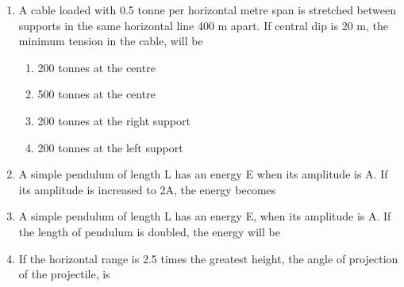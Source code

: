 \documentclass[11pt,a4paper]{article}
\begin{document}
\begin{enumerate}
{}
\\
\item{A cable loaded with 0.5 tonne per horizontal metre span is stretched between supports in the same horizontal line 400 m apart. If central dip is 20 m, the minimum tension in the cable, will be}
\begin{enumerate}[label=\Alph*.]
\item{200 tonnes at the centre}
\item{500 tonnes at the centre}
\item{200 tonnes at the right support}
\item{200 tonnes at the left support}
\end{enumerate}
\item{A simple pendulum of length L has an energy E when its amplitude is A. If its amplitude is increased to 2A, the energy becomes}
\\
\item{A simple pendulum of length L has an energy E, when its amplitude is A. If the length of pendulum is doubled, the energy will be}
\\
\item{If the horizontal range is 2.5 times the greatest height, the angle of projection of the projectile, is}
\\
\end{enumerate}
\end{document}
